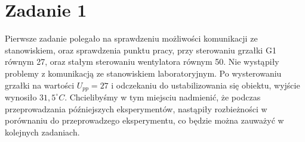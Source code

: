 \chapter{Zadanie 1}
Pierwsze zadanie polegało na sprawdzeniu możliwości komunikacji ze stanowiskiem, oraz sprawdzenia
punktu pracy, przy sterowaniu grzałki G1 równym 27, oraz stałym sterowaniu wentylatora równym 50.
Nie wystąpiły problemy z komunikacją ze stanowiskiem laboratoryjnym. Po wysterowaniu grzałki na wartości
$U_{pp} = 27$ i odczekaniu do ustabilizowania się obiektu, wyjście wynosiło $31,5^\circ C$.
Chcielibyśmy w tym miejsciu nadmienić, że podczas przeprowadzania późniejszych eksperymentów,
nastąpiły rozbieżności w porównaniu do przeprowadzego eksperymentu, co będzie można zauważyć
w kolejnych zadaniach.
